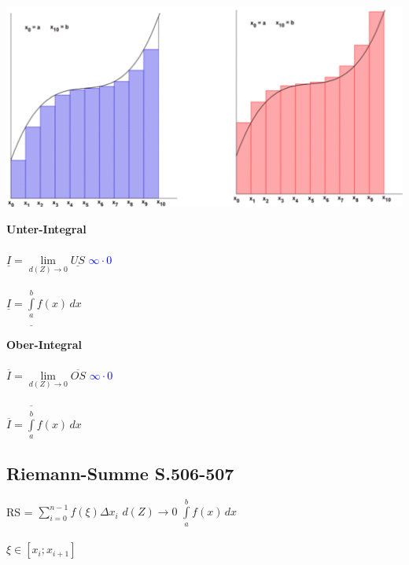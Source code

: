 		\includegraphics[width=0.8\linewidth]{Bilder/obersumme-untersumme} \\
		
		
		
		\begin{minipage}{0.45\linewidth}
		\textbf{Unter-Integral}		\\
		\\	
		$\underline{I} = \lim \limits_{d(Z) \rightarrow 0} \underline{US} $ \quad \textcolor{blue}{$\infty \cdot 0$} \\
		\\
		$\underline{I} =  \underline{\int \limits_{a}^{b}} f(x) \, dx $ \\
		
		\end{minipage}
		\hfill				
		\begin{minipage}{0.45\linewidth}
		
		
		\textbf{Ober-Integral}		\\
		\\	
		$\overline{I} = \lim \limits_{d(Z) \rightarrow 0} \overline{OS}$ \quad \textcolor{blue}{$\infty \cdot 0$} \\
		\\
		$\overline{I} =  \overline{\int \limits_{a}^{b}} f(x) \, dx $ \\

		\end{minipage}
		
		
		\subsection{Riemann-Summe S.506-507}
		RS = $\sum \limits_{i=0}^{n-1} f(\xi) \Delta x_i$  \quad $d(Z) \rightarrow 0 $ \quad $\int \limits_{a}^{b} f(x) \, dx$ \\
		\\
		$\xi \in [x_i ; x_{i+1}]$		
			
		
